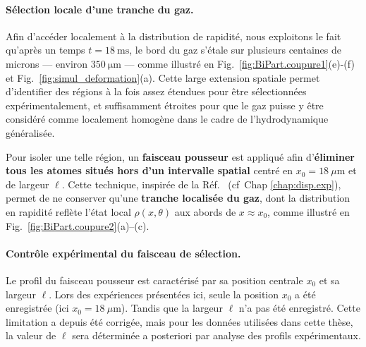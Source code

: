 \paragraph{Sélection locale d'une tranche du gaz.}

Afin d’accéder localement à la distribution de rapidité, nous exploitons le fait qu’après un temps $t = 18~\mathrm{ms}$, le bord du gaz s’étale sur plusieurs centaines de microns — environ $350~\mathrm{\mu m}$ — comme illustré en Fig.~\ref{fig:BiPart.coupure1}(e)-(f) et Fig.~\ref{fig:simul_deformation}(a). Cette large extension spatiale permet d’identifier des régions à la fois assez étendues pour être sélectionnées expérimentalement, et suffisamment étroites pour que le gaz puisse y être considéré comme localement homogène dans le cadre de l’hydrodynamique généralisée.

\medskip
\noindent
Pour isoler une telle région, un {\bf faisceau pousseur} est appliqué afin d’{\bf éliminer tous les atomes situés hors d’un intervalle spatial} centré en $x_0 = 18~\mu\mathrm{m}$ et de largeur $\ell$. Cette technique, inspirée de la Réf.~\cite{PhysRevLett.133.113402} (cf~Chap \ref{chap:disp.exp}), permet de ne conserver qu’une {\bf tranche localisée du gaz}, dont la distribution en rapidité reflète l’état local $\rho(x,\theta)$ aux abords de $x \approx x_0$, comme illustré en Fig.~\ref{fig:BiPart.coupure2}(a)--(c).


\medskip
\paragraph{Contrôle expérimental du faisceau de sélection.}

Le profil du faisceau pousseur est caractérisé par sa position centrale $x_0$ et sa largeur $\ell$. Lors des expériences présentées ici, seule la position $x_0$ a été enregistrée (ici $x_0 = 18~\mu\mathrm{m}$). Tandis que la largeur $\ell$ n’a pas été enregistré. Cette limitation  a depuis été corrigée, mais pour les données utilisées dans cette thèse, la valeur de $\ell$ sera déterminée a posteriori par analyse des profils expérimentaux.



